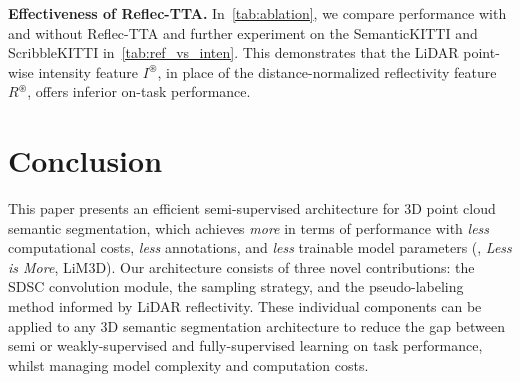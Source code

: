 \documentclass[10pt,twocolumn,letterpaper]{article}
\newcommand\bdtitle[1]{\noindent\textbf{#1}}
\begin{document}
\bdtitle{Effectiveness of Reflec-TTA.} In~\cref{tab:ablation}, we compare {\ourmodel} performance with and without Reflec-TTA and further experiment on the SemanticKITTI and ScribbleKITTI {\validset} in~\cref{tab:ref_vs_inten}. This demonstrates that the LiDAR point-wise intensity feature $I^\circledast$, in place of the distance-normalized reflectivity feature $R^\circledast$, offers inferior on-task performance. 


 \vspace{-0.2cm}   
\section{Conclusion}
\vspace{-0.2cm}  
\label{sec:conclusion}

\noindent
This paper presents an efficient semi-supervised architecture for 3D point cloud semantic segmentation, which achieves \textit{more} in terms of performance with \textit{less} computational costs, \textit{less} annotations, and \textit{less} trainable model parameters (\ie, \textit{Less is More}, LiM3D). Our architecture consists of three novel contributions: the SDSC convolution module,  the {\samplshort} sampling strategy, and the pseudo-labeling method informed by LiDAR reflectivity. These individual components can be applied to any 3D semantic segmentation architecture to reduce the gap between semi or weakly-supervised and fully-supervised learning on task performance, whilst managing model complexity and computation costs. 




 

\clearpage
{\small


}
\end{document}
